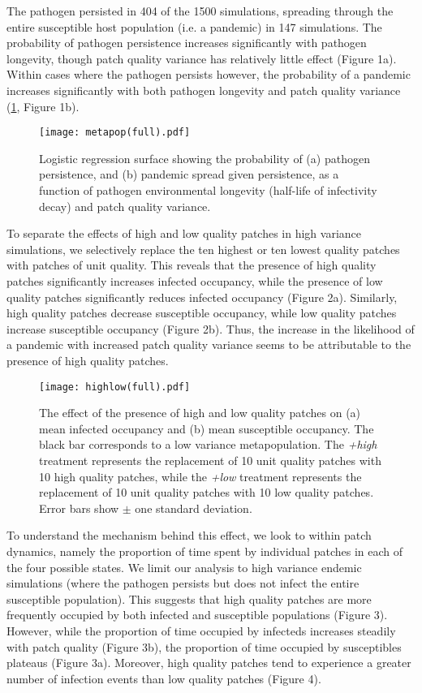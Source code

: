 \documentclass{svjour3}
\begin{document}
The pathogen persisted in 404 of the 1500 simulations, spreading through the entire susceptible host population (i.e. a pandemic) in 147 simulations.  The probability of pathogen persistence increases significantly with pathogen longevity, though patch quality variance has relatively little effect (Figure 1a).  Within cases where the pathogen persists however, the probability of a pandemic increases significantly with both pathogen longevity and patch quality variance (\ref{poutcome}, Figure 1b).

\begin{figure}
\label{poutcome}
\centering
\texttt{[image: metapop(full).pdf]}
\caption{Logistic regression surface showing the probability of (a) pathogen persistence, and (b) pandemic spread given persistence, as a function of pathogen environmental longevity (half-life of infectivity decay) and patch quality variance.}
\end{figure}   

To separate the effects of high and low quality patches in high variance simulations, we selectively replace the ten highest or ten lowest quality patches with patches of unit quality. This reveals that the presence of high quality patches significantly increases infected occupancy, while the presence of low quality patches significantly reduces infected occupancy (Figure 2a).  Similarly, high quality patches decrease susceptible occupancy, while low quality patches increase susceptible occupancy (Figure 2b).  Thus, the increase in the likelihood of a pandemic with increased patch quality variance seems to be attributable to the presence of high quality patches.

\begin{figure}
\label{sens}
\centering
\texttt{[image: highlow(full).pdf]}
\caption{The effect of the presence of high and low quality patches on (a) mean infected occupancy and (b) mean susceptible occupancy. The black bar corresponds to a low variance metapopulation.  The \textit{+high} treatment represents the replacement of 10 unit quality patches with 10 high quality patches, while the \textit{+low} treatment represents the replacement of 10 unit quality patches with 10 low quality patches.  Error bars show $\pm$ one standard deviation.}
\end{figure}

To understand the mechanism behind this effect, we look to within patch dynamics, namely the proportion of time spent by individual patches in each of the four possible states.  We limit our analysis to high variance endemic simulations (where the pathogen persists but does not infect the entire susceptible population).  This suggests that high quality patches are more frequently occupied by both infected and susceptible populations (Figure 3).  However, while the proportion of time occupied by infecteds increases steadily with patch quality (Figure 3b), the proportion of time occupied by susceptibles plateaus (Figure 3a).  Moreover, high quality patches tend to experience a greater number of infection events than low quality patches (Figure 4).
\end{document}
